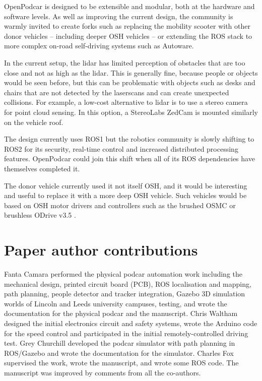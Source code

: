 \documentclass[a4paper]{article}
\begin{document}
	OpenPodcar is designed to be extensible and modular, both at the hardware and software levels.  As well as improving the current design, the community is warmly invited to create forks such as replacing the mobility scooter with other donor vehicles -- including deeper OSH vehicles -- or extending the ROS stack to more complex on-road self-driving systems such as Autoware.
	
	In the current setup, the lidar has limited perception of obstacles that are too close and not as high as the lidar. This is generally fine, because people or objects would be seen before, but this can be problematic with objects such as desks and chairs that are not detected by the laserscans and can create unexpected collisions. For example, a low-cost alternative to lidar is to use a stereo camera for point cloud sensing. In this option, a StereoLabs ZedCam is mounted similarly on the vehicle roof. 
	
	The design currently uses ROS1 but the robotics community is slowly shifting to ROS2 for its security, real-time control and increased distributed processing features.  OpenPodcar could join this shift when all of its ROS dependencies have themselves completed it.
	
	The donor vehicle currently used it not itself OSH, and it would be interesting and useful to replace it with a more deep OSH vehicle.   Such vehicles would be based on OSH motor drivers and controllers such as the brushed OSMC \cite{robotpoweropen} or brushless ODrive v3.5  \cite{oriveroboticsodrive}.
	
	
	\section*{Paper author contributions}\label{h.fy8hbipy6kwe}
	
	Fanta Camara performed the physical podcar automation work including the mechanical design, printed circuit board (PCB), ROS localisation and mapping, path planning, people detector and tracker integration, Gazebo 3D simulation worlds of Lincoln and Leeds university campuses, testing, and wrote the documentation for the physical podcar and  the manuscript. Chris Waltham designed the initial electronics circuit and safety systems, wrote the Arduino code for the speed control and participated in the initial remotely-controlled driving test. Grey Churchill developed the podcar simulator with path planning in ROS/Gazebo and wrote the documentation for the simulator. Charles Fox supervised the work, wrote the manuscript, and wrote some ROS code. The manuscript was improved by comments from all the co-authors.
	
\end{document}
